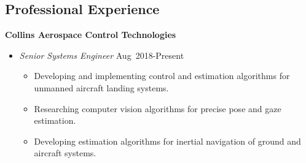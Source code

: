 \subsection*{Professional Experience}
{}

\textbf{Collins Aerospace Control Technologies}

\begin{itemize}
    \item[] \textit{Senior Systems Engineer} \hfill {Aug~2018-Present} 
        \begin{itemize}
            \item Developing and implementing control and estimation algorithms for unmanned aircraft landing systems.
            \item Researching computer vision algorithms for precise pose and gaze estimation.
            \item Developing estimation algorithms for inertial navigation of ground and aircraft systems.
        \end{itemize}
\end{itemize}

